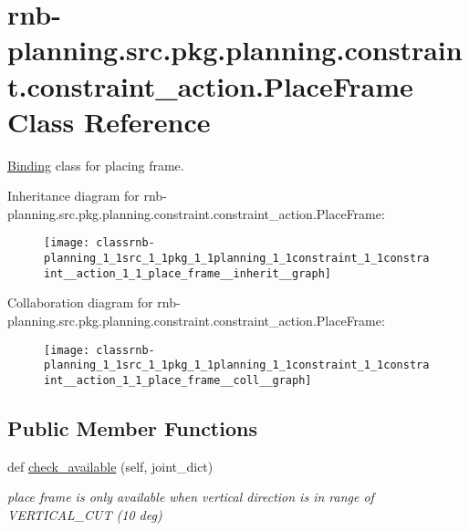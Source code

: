 \hypertarget{classrnb-planning_1_1src_1_1pkg_1_1planning_1_1constraint_1_1constraint__action_1_1_place_frame}{}\section{rnb-\/planning.src.\+pkg.\+planning.\+constraint.\+constraint\+\_\+action.\+Place\+Frame Class Reference}
\label{classrnb-planning_1_1src_1_1pkg_1_1planning_1_1constraint_1_1constraint__action_1_1_place_frame}


\hyperlink{classrnb-planning_1_1src_1_1pkg_1_1planning_1_1constraint_1_1constraint__action_1_1_binding}{Binding} class for placing frame.  




Inheritance diagram for rnb-\/planning.src.\+pkg.\+planning.\+constraint.\+constraint\+\_\+action.\+Place\+Frame\+:\nopagebreak
\begin{figure}[H]
\begin{center}
\leavevmode
\texttt{[image: classrnb-planning\_1\_1src\_1\_1pkg\_1\_1planning\_1\_1constraint\_1\_1constraint\_\_action\_1\_1\_place\_frame\_\_inherit\_\_graph]}
\end{center}
\end{figure}


Collaboration diagram for rnb-\/planning.src.\+pkg.\+planning.\+constraint.\+constraint\+\_\+action.\+Place\+Frame\+:\nopagebreak
\begin{figure}[H]
\begin{center}
\leavevmode
\texttt{[image: classrnb-planning\_1\_1src\_1\_1pkg\_1\_1planning\_1\_1constraint\_1\_1constraint\_\_action\_1\_1\_place\_frame\_\_coll\_\_graph]}
\end{center}
\end{figure}
\subsection*{Public Member Functions}
\begin{DoxyCompactItemize}
\item 
\mbox{\label{classrnb-planning_1_1src_1_1pkg_1_1planning_1_1constraint_1_1constraint__action_1_1_place_frame_a584bda652ca8c6144bb9bbc16de1f854}} 
def \hyperlink{classrnb-planning_1_1src_1_1pkg_1_1planning_1_1constraint_1_1constraint__action_1_1_place_frame_a584bda652ca8c6144bb9bbc16de1f854}{check\+\_\+available} (self, joint\+\_\+dict)
\begin{DoxyCompactList}\small\item\em place frame is only available when vertical direction is in range of V\+E\+R\+T\+I\+C\+A\+L\+\_\+\+C\+UT (10 deg) \end{DoxyCompactList}\end{DoxyCompactItemize}
